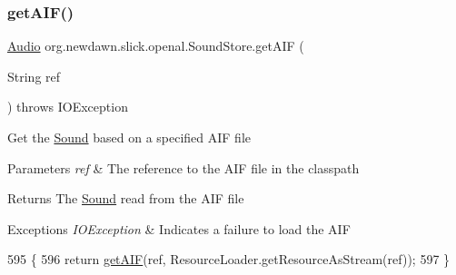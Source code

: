 \subsubsection{\texorpdfstring{get\+A\+I\+F()}{getAIF()}\hspace{0.1cm}{\footnotesize\ttfamily [1/3]}}
{\footnotesize\ttfamily \mbox{\hyperlink{interfaceorg_1_1newdawn_1_1slick_1_1openal_1_1_audio}{Audio}} org.\+newdawn.\+slick.\+openal.\+Sound\+Store.\+get\+A\+IF (\begin{DoxyParamCaption}\item[{String}]{ref }\end{DoxyParamCaption}) throws I\+O\+Exception\hspace{0.3cm}{\ttfamily [inline]}}

Get the \mbox{\hyperlink{classorg_1_1newdawn_1_1slick_1_1_sound}{Sound}} based on a specified A\+IF file


\begin{DoxyParams}{Parameters}
{\em ref} & The reference to the A\+IF file in the classpath \\
\hline
\end{DoxyParams}
\begin{DoxyReturn}{Returns}
The \mbox{\hyperlink{classorg_1_1newdawn_1_1slick_1_1_sound}{Sound}} read from the A\+IF file 
\end{DoxyReturn}

\begin{DoxyExceptions}{Exceptions}
{\em I\+O\+Exception} & Indicates a failure to load the A\+IF \\
\hline
\end{DoxyExceptions}

\begin{DoxyCode}
595                                                        \{
596         \textcolor{keywordflow}{return} \mbox{\hyperlink{classorg_1_1newdawn_1_1slick_1_1openal_1_1_sound_store_a1184883b7fdecc6504664956545dfad7}{getAIF}}(ref, ResourceLoader.getResourceAsStream(ref));
597     \}
\end{DoxyCode}
\mbox{\label{classorg_1_1newdawn_1_1slick_1_1openal_1_1_sound_store_a1228fb419583822621cf737c9ed9b52f}} 
